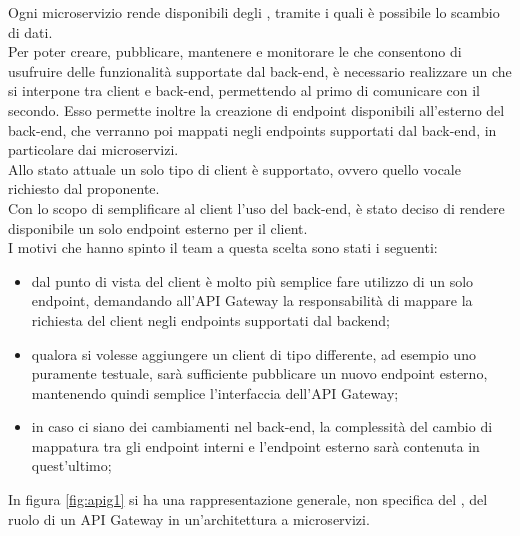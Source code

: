 Ogni microservizio rende disponibili degli , tramite i quali è possibile lo scambio di dati. \\
Per poter creare, pubblicare, mantenere e monitorare le  che consentono di usufruire delle funzionalità supportate dal back-end, è necessario realizzare un  che si interpone tra client e back-end, permettendo al primo di comunicare con il secondo.
Esso permette inoltre la creazione di endpoint disponibili all'esterno del back-end, che verranno poi mappati negli endpoints supportati dal back-end, in particolare dai microservizi.\\
Allo stato attuale un solo tipo di client è supportato, ovvero quello vocale richiesto dal proponente.\\
Con lo scopo di semplificare al client l'uso del back-end, è stato deciso di rendere disponibile un solo endpoint esterno per il client. \\
I motivi che hanno spinto il team a questa scelta sono stati i seguenti:
\begin{itemize}
	\item dal punto di vista del client è molto più semplice fare utilizzo di un solo endpoint, demandando all'API Gateway la responsabilità di mappare la richiesta del client negli endpoints supportati dal backend;
	\item qualora si volesse aggiungere un client di tipo differente, ad esempio uno puramente testuale, sarà sufficiente pubblicare un nuovo endpoint esterno, mantenendo quindi semplice l'interfaccia dell'API Gateway;
	\item in caso ci siano dei cambiamenti nel back-end, la complessità del cambio di mappatura tra gli endpoint interni e l'endpoint esterno sarà contenuta in quest'ultimo;
\end{itemize}

In figura \ref{fig:apig1} si ha una rappresentazione generale, non specifica del  \PROGETTO, del ruolo di un API Gateway in un'architettura a microservizi.\\

